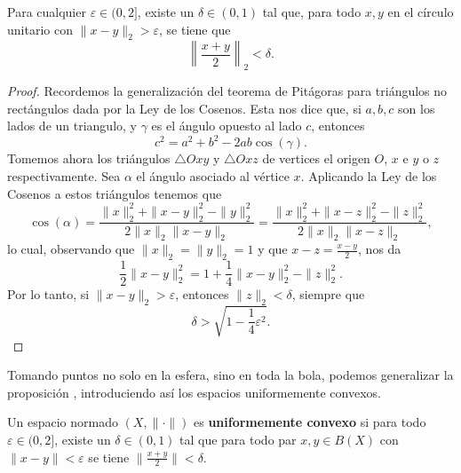\begin{proposition} \label{prop:3}
    Para cualquier $\varepsilon \in (0,2]$, existe un $\delta \in (0,1)$ tal que, para todo $x, y$ en el círculo unitario con $\|x - y\|_2 > \varepsilon$, se tiene que
    \begin{equation}
        \left\| \frac{x + y}{2} \right\|_2 < \delta.
    \end{equation}
\end{proposition}
\begin{proof}
    Recordemos la generalización del teorema de Pitágoras para triángulos no rectángulos dada por la Ley de los Cosenos. Esta nos dice que, si $ a, b, c $ son los lados de un triangulo, y $ \gamma $ es el ángulo opuesto al lado $ c $, entonces
    \begin{equation}
        c^2 = a^2 + b^2 - 2 a b \cos(\gamma).
    \end{equation}
    Tomemos ahora los triángulos $\triangle Oxy$ y $\triangle Oxz$ de vertices el origen $ O $, $ x $ e $ y $ o $ z $ respectivamente. Sea $ \alpha $ el ángulo asociado al vértice $ x $. Aplicando la Ley de los Cosenos a estos triángulos tenemos que 
    \begin{equation}
        \cos(\alpha) = \frac{\|x\|_2^2 + \|x - y\|_2^2 - \|y\|_2^2}{2 \|x\|_2 \|x - y\|_2} = \frac{\|x\|_2^2 + \|x - z\|_2^2 - \|z\|_2^2}{2 \|x\|_2 \|x - z\|_2},
    \end{equation}
    lo cual, observando que $\|x\|_2 = \|y\|_2 = 1$ y que $x - z = \frac{x - y}{2}$, nos da
    \begin{equation}
        \frac{1}{2} \|x - y\|_2^2 = 1 + \frac{1}{4} \|x - y\|_2^2 - \|z\|_2^2.
    \end{equation}
    Por lo tanto, si $\|x - y\|_2 > \varepsilon$, entonces $\|z\|_2 < \delta$, siempre que
    \begin{equation}
        \delta > \sqrt{1 - \frac{1}{4} \varepsilon^2}.
    \end{equation}
\end{proof}

Tomando puntos no solo en la esfera, sino en toda la bola, podemos generalizar la proposición , introduciendo así los espacios uniformemente convexos.

\begin{definition}
    Un espacio normado $ (X, \| \cdot \|) $ es {\bf uniformemente convexo} si para todo $ \varepsilon \in (0, 2] $, existe un $ \delta \in (0, 1) $ tal que para todo par $ x, y \in B(X) $ con $ \| x - y \| < \varepsilon $ se tiene $ \| \frac{x+y}{2} \| < \delta $.
\end{definition}


